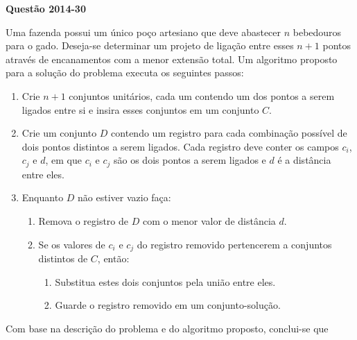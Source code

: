 \documentclass[12pt,a4paper]{article}
\newenvironment{question}[1]{%
    \pdfbookmark[3]{Questão #1}{q:#1}
    \label{q:#1}
    \bigskip\par\noindent
    \textbf{Questão #1} \dotfill
    \medskip\par\nopagebreak\noindent
    \ignorespaces
}{%
    \noindent\dotfill\medskip
}
\begin{document}
\begin{question}{2014-30}
Uma fazenda possui um único poço artesiano que deve abastecer $n$ bebedouros para o gado.
Deseja-se determinar um projeto de ligação entre esses $n+1$ pontos através de encanamentos com a menor extensão total.
Um algoritmo proposto para a solução do problema executa os seguintes passos:

\begin{small}
\begin{enumerate}
    \item Crie $n+1$ conjuntos unitários,
    cada um contendo um dos pontos a serem ligados entre si e insira esses conjuntos em um conjunto $C$.
    \item Crie um conjunto $D$ contendo um registro para cada combinação possível de dois pontos distintos a serem ligados.
    Cada registro deve conter os campos $c_i$,
    $c_j$ e $d$, em que $c_i$ e $c_j$ são os dois pontos a serem ligados e $d$ é a distância entre eles.
    \item Enquanto $D$ não estiver vazio faça:
    \begin{enumerate}
        \item[3.1.] Remova o registro de $D$ com o menor valor de distância $d$.
        \item[3.2.] Se os valores de $c_i$ e $c_j$ do registro removido pertencerem a conjuntos distintos de $C$, então:
        \begin{enumerate}
            \item[3.2.1.] Substitua estes dois conjuntos pela união entre eles.
            \item[3.2.2.] Guarde o registro removido em um conjunto-solução.
        \end{enumerate}
    \end{enumerate}
\end{enumerate}
\end{small}

\noindent
Com base na descrição do problema e do algoritmo proposto, conclui-se que


\end{question}
\end{document}
